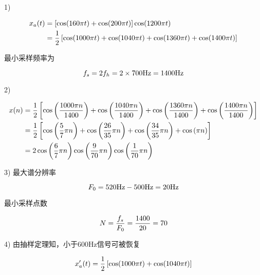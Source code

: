 \documentclass[cn, hazy, blue, normal, 12pt]{elegantnote}
\begin{document}
\begin{solution}[print=true]
    
1)

\begin{equation}
\notag
\begin{aligned}
    x_a(t)&=\left[\cos(160\pi t)+\cos(200\pi t)\right]\cos(1200\pi t) \\
    &=\frac{1}{2}\left[\cos(1000\pi t)+\cos(1040\pi t)+\cos(1360\pi t)+\cos(1400\pi t)\right]
\end{aligned}
\end{equation}

最小采样频率为

\begin{equation}
\notag
    f_s=2f_h=2\times 700\text{Hz}=1400\text{Hz}
\end{equation}

2)

\begin{equation}
\notag
\begin{aligned}
    x(n)&=\frac{1}{2}\left[\cos\left(\frac{1000\pi n}{1400}\right)+\cos\left(\frac{1040\pi n}{1400}\right)+\cos\left(\frac{1360\pi n}{1400}\right)+\cos\left(\frac{1400\pi n}{1400}\right)\right] \\
    &=\frac{1}{2}\left[\cos\left(\frac{5}{7}\pi n\right)+\cos\left(\frac{26}{35}\pi n\right)+\cos\left(\frac{34}{35}\pi n\right)+\cos\left(\pi n\right)\right] \\
    &=2\cos\left(\frac{6}{7}\pi n\right)\cos\left(\frac{9}{70}\pi n\right)\cos\left(\frac{1}{70}\pi n\right)
\end{aligned}
\end{equation}

3) 最大谱分辨率

\begin{equation}
\notag
    F_0=520\text{Hz}-500\text{Hz}=20\text{Hz}
\end{equation}

最小采样点数

\begin{equation}
\notag
    N=\frac{f_s}{F_0}=\frac{1400}{20}=70
\end{equation}

4) 由抽样定理知，小于600Hz信号可被恢复

\begin{equation}
\notag
    x'_a(t)=\frac{1}{2}\left[\cos(1000\pi t)+\cos(1040\pi t)\right]
\end{equation}

\end{solution}
\end{document}
